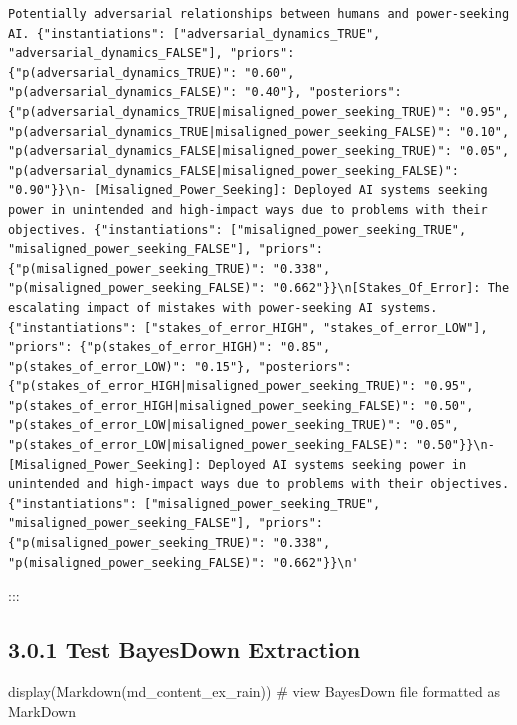 \documentclass[
  11pt,
  letterpaper,
]{book}
\newenvironment{Shaded}{\begin{snugshade}}{\end{snugshade}}
\newcommand{\CommentTok}[1]{\textcolor[rgb]{0.37,0.37,0.37}{#1}}
\newcommand{\NormalTok}[1]{\textcolor[rgb]{0.00,0.23,0.31}{#1}}
\begin{document}
\begin{verbatim}
Potentially adversarial relationships between humans and power-seeking AI. {"instantiations": ["adversarial_dynamics_TRUE", "adversarial_dynamics_FALSE"], "priors": {"p(adversarial_dynamics_TRUE)": "0.60", "p(adversarial_dynamics_FALSE)": "0.40"}, "posteriors": {"p(adversarial_dynamics_TRUE|misaligned_power_seeking_TRUE)": "0.95", "p(adversarial_dynamics_TRUE|misaligned_power_seeking_FALSE)": "0.10", "p(adversarial_dynamics_FALSE|misaligned_power_seeking_TRUE)": "0.05", "p(adversarial_dynamics_FALSE|misaligned_power_seeking_FALSE)": "0.90"}}\n- [Misaligned_Power_Seeking]: Deployed AI systems seeking power in unintended and high-impact ways due to problems with their objectives. {"instantiations": ["misaligned_power_seeking_TRUE", "misaligned_power_seeking_FALSE"], "priors": {"p(misaligned_power_seeking_TRUE)": "0.338", "p(misaligned_power_seeking_FALSE)": "0.662"}}\n[Stakes_Of_Error]: The escalating impact of mistakes with power-seeking AI systems. {"instantiations": ["stakes_of_error_HIGH", "stakes_of_error_LOW"], "priors": {"p(stakes_of_error_HIGH)": "0.85", "p(stakes_of_error_LOW)": "0.15"}, "posteriors": {"p(stakes_of_error_HIGH|misaligned_power_seeking_TRUE)": "0.95", "p(stakes_of_error_HIGH|misaligned_power_seeking_FALSE)": "0.50", "p(stakes_of_error_LOW|misaligned_power_seeking_TRUE)": "0.05", "p(stakes_of_error_LOW|misaligned_power_seeking_FALSE)": "0.50"}}\n- [Misaligned_Power_Seeking]: Deployed AI systems seeking power in unintended and high-impact ways due to problems with their objectives. {"instantiations": ["misaligned_power_seeking_TRUE", "misaligned_power_seeking_FALSE"], "priors": {"p(misaligned_power_seeking_TRUE)": "0.338", "p(misaligned_power_seeking_FALSE)": "0.662"}}\n'
\end{verbatim}

:::

\subsection{3.0.1 Test BayesDown
Extraction}\label{test-bayesdown-extraction}

\begin{Shaded}
\begin{Highlighting}[]
\NormalTok{display(Markdown(md\_content\_ex\_rain)) }\CommentTok{\# view BayesDown file formatted as MarkDown}
\end{Highlighting}
\end{Shaded}
\end{document}
